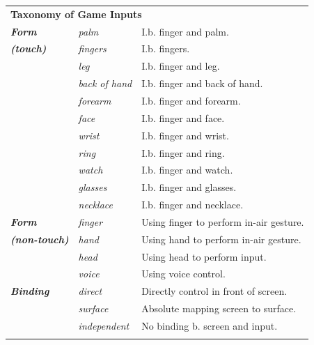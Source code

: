 \documentclass{sigchi}
\newcommand\tabhead[1]{\small\textbf{#1}}
\begin{document}
    \begin{table}
    \centering
    \begin{adjustwidth}{-1cm}{}
    \begin{tabular}{|l|l|l|}
      \hline
      \multicolumn{3}{|p{1.06\columnwidth}|}{\centering\tabhead{\textbf{Taxonomy of Game Inputs}}}\\
      \Xhline{4\arrayrulewidth}
        \textbf{\em{Form}} & \em{palm} & I.b. finger and palm. \\ \cline{2-3} 
        \textbf{\em{{\fontsize{0.3cm}{1em}\selectfont (touch)}}} & \em{fingers} & I.b. fingers.\\ \cline{2-3} 
             & \em{leg} & I.b. finger and leg.\\ \cline{2-3} 
             & \em{back of hand} & I.b. finger and back of hand.\\ \cline{2-3} 
             & \em{forearm} & I.b. finger and forearm.\\ \cline{2-3} 
             & \em{face} & I.b. finger and face.\\ \cline{2-3} 
             & \em{wrist} & I.b. finger and wrist.\\ \cline{2-3} 
             & \em{ring} & I.b. finger and ring. \\ \cline{2-3} 
             & \em{watch} & I.b. finger and watch.\\ \cline{2-3} 
             & \em{glasses} & I.b. finger and glasses.\\ \cline{2-3} 
             & \em{necklace} & I.b. finger and necklace.\\ 
       \Xhline{4\arrayrulewidth}
        \textbf{\em{Form}} & \em{finger} & Using finger to perform in-air gesture.\\ \cline{2-3} 
        \textbf{\em{{\fontsize{0.3cm}{1em}\selectfont (non-touch)}}}  & \em{hand} & Using hand to perform in-air gesture.\\ \cline{2-3} 
             & \em{head} & Using head to perform input.\\ \cline{2-3} 
             & \em{voice} & Using voice control.\\ 
      \Xhline{4\arrayrulewidth}
        \textbf{\em{Binding}} & \em{direct} & Directly control in front of screen. \\ \cline{2-3} 
             & \em{surface} & Absolute mapping screen to surface.\\ \cline{2-3} 
             & \em{independent} & No binding b. screen and input.\\
      \Xhline{4\arrayrulewidth}

\end{tabular}
\end{adjustwidth}
\end{table}
\end{document}
